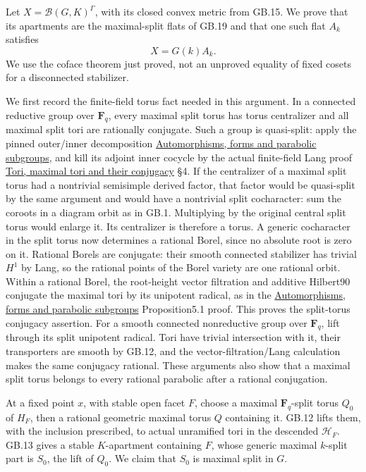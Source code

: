 \documentclass[
  11pt,
]{article}
\begin{document}
Let \(X=\mathcal B(G,K)^\Gamma\), with its closed convex metric from
GB.15. We prove that its apartments are the maximal-split flats of GB.19
and that one such flat \(A_k\) satisfies \[
                              X=G(k)A_k .                   \tag{GB22.1}
\] We use the coface theorem just proved, not an unproved equality of
fixed cosets for a disconnected stabilizer.

We first record the finite-field torus fact needed in this argument. In
a connected reductive group over \(\mathbf F_q\), every maximal split
torus has torus centralizer and all maximal split tori are rationally
conjugate. Such a group is quasi-split: apply the pinned outer/inner
decomposition \href{../AG-RG/AG-RG-06.html}{Automorphisms, forms and
parabolic subgroups}, and kill its adjoint inner cocycle by the actual
finite-field Lang proof \href{../AG-RG/AG-RG-01.html}{Tori, maximal tori
and their conjugacy} §4. If the centralizer of a maximal split torus had
a nontrivial semisimple derived factor, that factor would be quasi-split
by the same argument and would have a nontrivial split cocharacter: sum
the coroots in a diagram orbit as in GB.1. Multiplying by the original
central split torus would enlarge it. Its centralizer is therefore a
torus. A generic cocharacter in the split torus now determines a
rational Borel, since no absolute root is zero on it. Rational Borels
are conjugate: their smooth connected stabilizer has trivial \(H^1\) by
Lang, so the rational points of the Borel variety are one rational
orbit. Within a rational Borel, the root-height vector filtration and
additive Hilbert90 conjugate the maximal tori by its unipotent radical,
as in the \href{../AG-RG/AG-RG-06.html}{Automorphisms, forms and
parabolic subgroups} Proposition5.1 proof. This proves the split-torus
conjugacy assertion. For a smooth connected nonreductive group over
\(\mathbf F_q\), lift through its split unipotent radical. Tori have
trivial intersection with it, their transporters are smooth by GB.12,
and the vector-filtration/Lang calculation makes the same conjugacy
rational. These arguments also show that a maximal split torus belongs
to every rational parabolic after a rational conjugation.

At a fixed point \(x\), with stable open facet \(F\), choose a maximal
\(\mathbf F_q\)-split torus \(Q_0\) of \(H_F\), then a rational
geometric maximal torus \(Q\) containing it. GB.12 lifts them, with the
inclusion prescribed, to actual unramified tori in the descended
\(\mathcal H_F\). GB.13 gives a stable \(K\)-apartment containing \(F\),
whose generic maximal \(k\)-split part is \(S_0\), the lift of \(Q_0\).
We claim that \(S_0\) is maximal split in \(G\).
\end{document}
